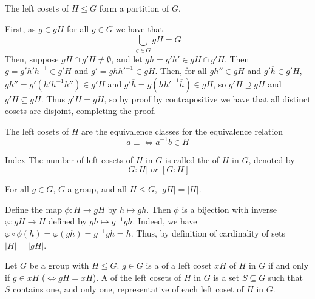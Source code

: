 \documentclass[12pt, a4paper, twoside, openright, titlepage]{book}
\begin{document}
\begin{lem}{}{}
        The left cosets of $H \leq G$ form a partition of $G$.
\end{lem}
\begin{proof*}{}{}
        First, as $g \in gH$ for all $g \in G$ we have that $$\bigcup\limits_{g\in G}gH = G$$
        Then, suppose $gH\cap g'H \neq \emptyset$, and let $gh = g'h' \in gH\cap g'H$. Then $g = g'h'h^{-1} \in g'H$ and $g' = gh{h'}^{-1} \in gH$. Then, for all $gh'' \in gH$ and $g'\overline{h} \in g'H$, $gh'' = g'(h'h^{-1}h'') \in g'H$ and $g'\overline{h} = g(h{h'}^{-1}\overline{h}) \in gH$, so $g'H \supseteq gH$ and $g'H \subseteq gH$. Thus $g'H = gH$, so by proof by contrapositive we have that all distinct cosets are disjoint, completing the proof.
\end{proof*}

\begin{rmk}{}{}
        The left cosets of $H$ are the equivalence classes for the equivalence relation \begin{equation}
                a \equiv \iff a^{-1}b \in H
        \end{equation}
\end{rmk}

\begin{defn}{Index}{}
        The number of left cosets of $H$ in $G$ is called the  of $H$ in $G$, denoted by \begin{equation}
                |G:H|\;or\;[G:H]
        \end{equation}
\end{defn}


\begin{lem}{}{}
        For all $g \in G$, $G$ a group, and all $H \leq G$, $|gH| = |H|$.
\end{lem}
\begin{proof*}{}{}
        Define the map $\phi:H\rightarrow gH$ by $h \mapsto gh$. Then $\phi$ is a bijection with inverse $\varphi:gH\rightarrow H$ defined by $gh \mapsto g^{-1}gh$. Indeed, we have $\varphi \circ \phi(h) = \varphi(gh) = g^{-1}gh = h$. Thus, by definition of cardinality of sets $|H| = |gH|$.
\end{proof*}



\begin{defn}{}{}
        Let $G$ be a group with $H \leq G$. $g \in G$ is a  of a left coset $xH$ of $H$ in $G$ if and only if $g \in xH$ ($\iff gH = xH$). A  of the left cosets of $H$ in $G$ is a set $S \subseteq G$ such that $S$ contains one, and only one, representative of each left coset of $H$ in $G$.
\end{defn}
\end{document}

